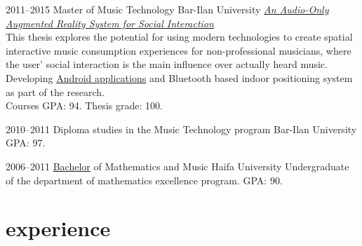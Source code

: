 \documentclass[]{friggeri-cv}  %
\begin{document}
\begin{entrylist}

    \entry
    {2011--2015}
    {Master {\normalfont of Music Technology}}
    {Bar-Ilan University}
    {\href{http://tomgurion.blogspot.com/p/master-thesis.html}{\emph{An Audio-Only Augmented Reality System for Social Interaction}}\\
    This thesis explores the potential for using modern technologies to create spatial interactive music consumption experiences for non-professional musicians, where the user' social interaction is the main influence over actually heard music.\\
    Developing \href{https://github.com/Nagasaki45/ScenePlayer-Plus/}{Android applications} and Bluetooth based indoor positioning system as part of the research.\\
    Courses GPA: 94. Thesis grade: 100.}

\end{entrylist}
\begin{entrylist}

    \entry
    {2010--2011}
    {Diploma studies {\normalfont in the Music Technology program}}
    {Bar-Ilan University}
    {GPA: 97.}

\end{entrylist}
\begin{entrylist}

    \entry
    {2006--2011}
    {\href{http://db.tt/i2NzAkni}{Bachelor} {\normalfont of Mathematics and Music}}
    {Haifa University}
    {Undergraduate of the department of mathematics excellence program. GPA: 90.}

\end{entrylist}


\section{experience}
\end{document}

